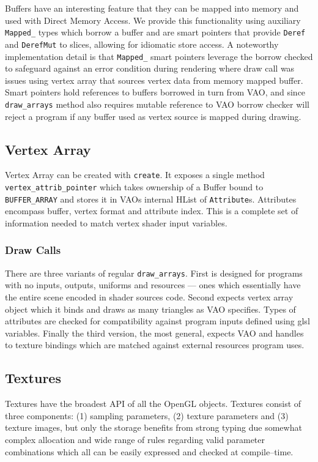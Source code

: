 Buffers have an interesting feature that they can be mapped into memory and used with Direct Memory Access.
We provide this functionality using auxiliary \texttt{Mapped\_} types which borrow a buffer and are smart pointers that provide \texttt{Deref} and \texttt{DerefMut} to slices,
allowing for idiomatic store access.
A noteworthy implementation detail is that \texttt{Mapped\_} smart pointers leverage the borrow checked to safeguard against an error condition during rendering
where draw call was issues using vertex array that sources vertex data from memory mapped buffer. 
Smart pointers hold references to buffers borrowed in turn from VAO, and since \texttt{draw\_arrays} method also requires mutable reference to VAO borrow checker will reject
a program if any buffer used as vertex source is mapped during drawing.

\subsection{Vertex Array}

Vertex Array can be created with \texttt{create}.
It exposes a single method \texttt{vertex\_attrib\_pointer} which takes ownership of a Buffer bound to \texttt{BUFFER\_ARRAY}
and stores it in VAOs internal HList of \texttt{Attribute}s.
Attributes encompass buffer, vertex format and attribute index. This is a complete set of information needed to match vertex shader input variables.

\subsubsection{Draw Calls}

There are three variants of regular \texttt{draw\_arrays}. First is designed for programs with no inputs, outputs, uniforms and resources --- ones which essentially have the entire scene
encoded in shader sources code. 
Second expects vertex array object which it binds and draws as many triangles as VAO specifies. Types of attributes are checked for compatibility against program inputs defined using glsl variables.
Finally the third version, the most general, expects VAO and handles to texture bindings which are matched against external resources program uses. 

\subsection{Textures}

Textures have the broadest API of all the OpenGL objects.
Textures consist of three components: (1) sampling parameters, (2) texture parameters and (3) texture images, but only the storage benefits 
from strong typing due somewhat complex allocation and wide range of rules regarding valid parameter combinations which all can be easily expressed and checked at compile--time.

